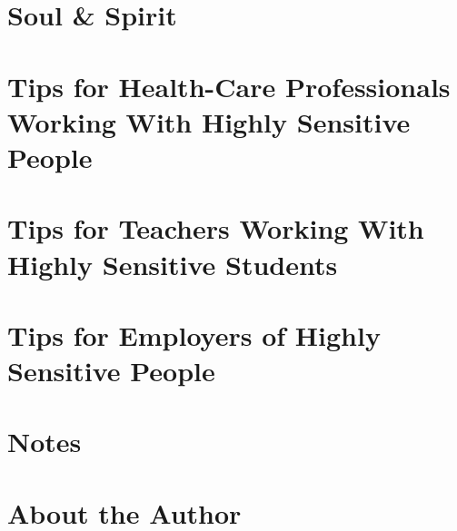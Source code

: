 \documentclass{article}
\numberwithin{equation}{section}
\begin{document}

\section{Soul \& Spirit}


\section{Tips for Health-Care Professionals Working With Highly Sensitive People}


\section{Tips for Teachers Working With Highly Sensitive Students}


\section{Tips for Employers of Highly Sensitive People}


\section{Notes}


\section{About the Author}


\printbibliography[heading=bibintoc]
	
\end{document}

